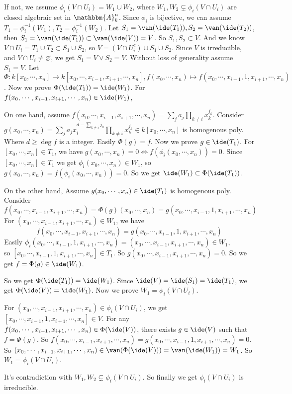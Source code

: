 \documentclass{ctexart}
\begin{document}
\begin{solution}
  If not, we assume \(\phi_i(V \cap U_i)=W_1 \cup W_2\), where \(W_1,W_2 \subsetneq \phi_i(V \cap U_i)\) are closed algebraic set in \(\mathbbm{A}_k^n\). 
  Since \(\phi_i\) is bijective, we can assume \(T_1=\phi_i^{-1}(W_1),T_2=\phi_i^{-1}(W_2)\). 
  Let \(S_1=\van(\ide(T_1)), S_2=\van(\ide(T_2))\), then \(S_1=\van(\ide(T_1)) \subset \van(\ide(V))=V\). So \(S_1,S_2 \subset V\). 
  And we know \(V \cap U_i=T_1 \cup T_2 \subset S_1 \cup S_2\), so \(V=(V \cap U_i^c) \cup S_1 \cup S_2\). 
  Since \(V\) is irreducible, and \(V \cap U_i \neq \varnothing\), we get \(S_1=V \vee S_2=V\). 
  Without loss of generality assume \(S_1=V\). 
  Let \(\Phi:k[x_0,\cdots,x_n] \to k[x_0,\cdots,x_{i-1},x_{i+1},\cdots,x_n],f(x_0,\cdots,x_n)\mapsto f(x_0,\cdots,x_{i-1},1,x_{i+1},\cdots,x_n)\). 
  Now we prove \( \Phi(\ide(T_1))=\ide(W_1)\). For \(f(x_0,\cdots,x_{i-1},x_{i+1},\cdots,x_n) \in \ide(W_1)\), 

  On one hand, assume \(f(x_0,\cdots,x_{i-1},x_{i+1},\cdots,x_n)=\sum_{j} a_j \prod_{k \neq i} x_k^{j_k}\). 
  Consider \(g(x_0,\cdots,x_n)=\sum_{j} a_jx_i^{d-\sum_{k \neq i} j_k} \prod_{k \neq i} x_k^{j_k} \in k[x_0,\cdots,x_n]\) is homogenous poly. 
  Where \(d \geq \deg f\) is a integer. Easily \(\Phi(g)=f\). Now we prove \(g \in \ide(T_1)\). 
  For \([x_0,\cdots,x_n] \in T_1\), we have \(g(x_0,\cdots,x_n)=0 \iff f(\phi_i(x_0,\cdots,x_n))=0\). 
  Since \([x_0,\cdots,x_n]\in T_1\) we get \(\phi_i(x_0,\cdots,x_n) \in W_1\), so \(g(x_0,\cdots,x_n)=f(\phi_i(x_0,\cdots,x_n))=0\). 
  So we get \(\ide(W_1)\subset \Phi(\ide(T_1))\). 

  On the other hand, Assume \(g(x_0,\cdots,x_n) \in \ide(T_1)\) is homogenous poly. 
  Consider 
  \[f(x_0,\cdots,x_{i-1},x_{i+1},\cdots,x_n)=\Phi(g)(x_0,\cdots,x_n)=g(x_0,\cdots,x_{i-1},1,x_{i+1},\cdots,x_n)\] 
  For \((x_0,\cdots,x_{i-1},x_{i+1},\cdots,x_n) \in W_1\), we have 
  \[f(x_0,\cdots,x_{i-1},x_{i+1},\cdots,x_n)=g(x_0,\cdots,x_{i-1},1,x_{i+1},\cdots,x_n)\] 
  Easily \(\phi_i(x_0,\cdots,x_{i-1},1,x_{i+1},\cdots,x_n)=(x_0,\cdots,x_{i-1},x_{i+1},\cdots,x_n) \in W_1\), \\
  so \([x_0,\cdots,x_{i-1},1,x_{i+1},\cdots,x_n] \in T_1\). So \(g(x_0,\cdots,x_{i-1},x_{i+1},\cdots,x_n)=0\). 
  So we get \(f=\Phi(g) \in \ide(W_1)\). 

  So we get \(\Phi(\ide(T_1))=\ide(W_1)\). Since \(\ide(V)=\ide(S_1)=\ide(T_1)\), we get \(\Phi(\ide(V))=\ide(W_1)\). 
  Now we prove \(W_1=\phi_i(V \cap U_i)\).

  For \((x_0,\cdots,x_{i-1},x_{i+1},\cdots,x_n) \in \phi_i(V \cap U_i)\), we get \([x_0,\cdots,x_{i-1},1,x_{i+1},\cdots,x_n] \in V\). 
  For any \(f(x_0,\cdots,x_{i-1},x_{i+1},\cdots,x_n) \in \Phi(\ide(V))\), there exists \(g \in \ide(V)\) such that \(f=\Phi(g)\). 
  So \(f(x_0,\cdots,x_{i-1},x_{i+1},\cdots,x_n)=g(x_0,\cdots,x_{i-1},1,x_{i+1},\cdots,x_n)=0\). 
  So \((x_0,\cdots,x_{i-1},x_{i+1},\cdots,x_n) \in \van(\Phi(\ide(V)))= \van(\ide(W_1))=W_1\). 
  So \(W_1 = \phi_i(V \cap U_i)\). 

  It's contradiction with \(W_1,W_2 \subsetneq \phi_i(V \cap U_i)\). 
  So finally we get \(\phi_i(V \cap U_i)\) is irreducible. 
\end{solution}
\end{document}
